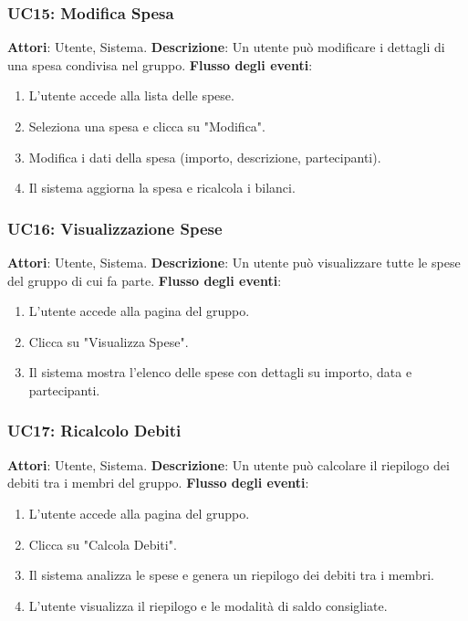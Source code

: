 \subsubsection{UC15: Modifica Spesa}
\textbf{Attori}: Utente, Sistema.
\newline
\newline
\textbf{Descrizione}: Un utente può modificare i dettagli di una spesa condivisa nel gruppo.
\newline
\newline
\textbf{Flusso degli eventi}:
\begin{enumerate}
    \item L’utente accede alla lista delle spese.
    \item Seleziona una spesa e clicca su "Modifica".
    \item Modifica i dati della spesa (importo, descrizione, partecipanti).
    \item Il sistema aggiorna la spesa e ricalcola i bilanci.
\end{enumerate}

\subsubsection{UC16: Visualizzazione Spese}
\textbf{Attori}: Utente, Sistema.
\newline
\newline
\textbf{Descrizione}: Un utente può visualizzare tutte le spese del gruppo di cui fa parte.
\newline
\newline
\textbf{Flusso degli eventi}:
\begin{enumerate}
    \item L’utente accede alla pagina del gruppo.
    \item Clicca su "Visualizza Spese".
    \item Il sistema mostra l’elenco delle spese con dettagli su importo, data e partecipanti.
\end{enumerate}

\subsubsection{UC17: Ricalcolo Debiti}
\textbf{Attori}: Utente, Sistema.
\newline
\newline
\textbf{Descrizione}: Un utente può calcolare il riepilogo dei debiti tra i membri del gruppo.
\newline
\newline
\textbf{Flusso degli eventi}:
\begin{enumerate}
    \item L’utente accede alla pagina del gruppo.
    \item Clicca su "Calcola Debiti".
    \item Il sistema analizza le spese e genera un riepilogo dei debiti tra i membri.
    \item L’utente visualizza il riepilogo e le modalità di saldo consigliate.
\end{enumerate}


